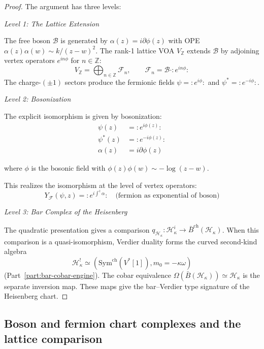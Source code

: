 \begin{proof}
The argument has three levels:

\emph{Level 1: The Lattice Extension}

The free boson $\mathcal{B}$ is generated by $\alpha(z) = i\partial\phi(z)$ with OPE $\alpha(z)\alpha(w) \sim k/(z-w)^2$. The rank-1 lattice VOA $V_{\mathbb{Z}}$ extends $\mathcal{B}$ by adjoining vertex operators $e^{in\phi}$ for $n \in \mathbb{Z}$:
\[
V_{\mathbb{Z}} = \bigoplus_{n \in \mathbb{Z}} \mathcal{F}_n, \qquad \mathcal{F}_n = \mathcal{B} \cdot {:}e^{in\phi}{:}
\]
The charge-$(\pm 1)$ sectors produce the fermionic fields $\psi = {:}e^{i\phi}{:}$ and $\psi^* = {:}e^{-i\phi}{:}$.

\emph{Level 2: Bosonization}

The explicit isomorphism is given by bosonization:
\begin{align}
\psi(z) &= :e^{i\phi(z)}: \\
\psi^*(z) &= :e^{-i\phi(z)}: \\
\alpha(z) &= i\partial\phi(z)
\end{align}

where $\phi$ is the bosonic field with $\phi(z)\phi(w) \sim -\log(z-w)$.

This realizes the isomorphism at the level of vertex operators:
\[
Y_{\mathcal{F}}(\psi, z) = :e^{i\int^z \alpha}: \quad \text{(fermion as exponential of boson)}
\]

\emph{Level 3: Bar Complex of the Heisenberg}

The quadratic presentation gives a comparison
$q_{\mathcal H_\kappa}\colon\mathcal H_\kappa^i\to
\bar B^{\mathrm{ch}}(\mathcal H_\kappa)$.  When this comparison is a
quasi-isomorphism, Verdier duality forms the curved second-kind algebra
\[
\mathcal{H}_\kappa^!
\simeq(\mathrm{Sym}^{\mathrm{ch}}(V^*[1]),m_0=-\kappa\omega)
\]
(Part~\ref{part:bar-cobar-engine}).  The cobar equivalence
$\Omega(\bar B(\mathcal H_\kappa))\simeq\mathcal H_\kappa$ is the
separate inversion map.  These maps give the bar--Verdier type
signature of the Heisenberg chart.
\end{proof}

\subsection{Boson and fermion chart complexes and the lattice comparison}


